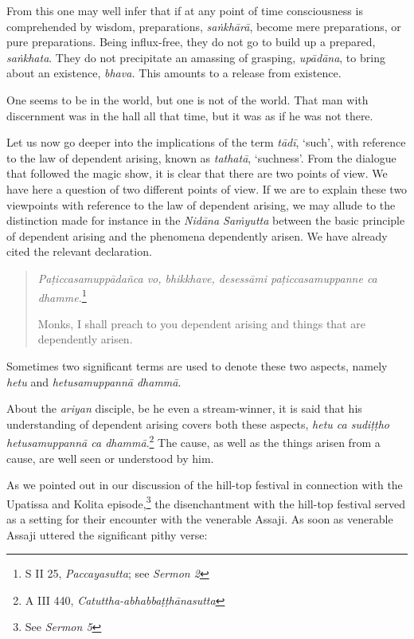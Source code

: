 From this one may well infer that if at any point of time consciousness is comprehended by wisdom, preparations, \emph{saṅkhārā}, become mere preparations, or pure preparations. Being influx-free, they do not go to build up a prepared, \emph{saṅkhata}. They do not precipitate an amassing of grasping, \emph{upādāna}, to bring about an existence, \emph{bhava.} This amounts to a release from existence.

One seems to be in the world, but one is not of the world. That man with discernment was in the hall all that time, but it was as if he was not there.

Let us now go deeper into the implications of the term \emph{tādī}, `such', with reference to the law of dependent arising, known as \emph{tathatā}, `suchness'. From the dialogue that followed the magic show, it is clear that there are two points of view. We have here a question of two different points of view. If we are to explain these two viewpoints with reference to the law of dependent arising, we may allude to the distinction made for instance in the \emph{Nidāna Saṁyutta} between the basic principle of dependent arising and the phenomena dependently arisen. We have already cited the relevant declaration.

\begin{quote}
\emph{Paṭiccasamuppādañca vo, bhikkhave, desessāmi paṭiccasamuppanne ca dhamme.}\footnote{S II 25, \emph{Paccayasutta}; see \emph{Sermon 2}}

Monks, I shall preach to you dependent arising and things that are dependently arisen.
\end{quote}

Sometimes two significant terms are used to denote these two aspects, namely \emph{hetu} and \emph{hetusamuppannā dhammā}.

About the \emph{ariyan} disciple, be he even a stream-winner, it is said that his understanding of dependent arising covers both these aspects, \emph{hetu ca sudiṭṭho hetusamuppannā ca dhammā}.\footnote{A III 440, \emph{Catuttha-abhabbaṭṭhānasutta}} The cause, as well as the things arisen from a cause, are well seen or understood by him.

As we pointed out in our discussion of the hill-top festival in connection with the Upatissa and Kolita episode,\footnote{See \emph{Sermon 5}} the disenchantment with the hill-top festival served as a setting for their encounter with the venerable Assaji. As soon as venerable Assaji uttered the significant pithy verse:

